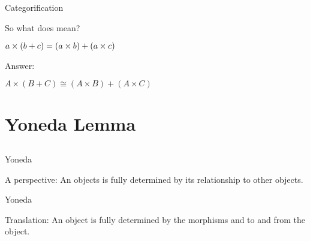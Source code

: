 \documentclass[tikz]{beamer}
\theoremstyle{definition}
\begin{document}
\begin{frame}{Categorification}
    
    So what does mean?
    
    \begin{block}{}
        $a \times (b + c) = (a \times b) + (a \times c) 
        \\$
    \end{block}{}
 
 Answer:

\begin{block}{}
    $A \times (B + C) \cong (A \times B) + (A \times C)$
\end{block}{}
 
\end{frame}{}

\section{Yoneda Lemma}
\subsection{}
\begin{frame}{Yoneda}
    
\begin{block}{A perspective:}
    An objects is fully determined by its relationship to other objects.
\end{block}{}


\end{frame}

\begin{frame}{Yoneda}
    
    
\begin{block}{Translation:}
    An object is fully determined by the morphisms and to and from the object.
\end{block}{}

\end{frame}
\end{document}
